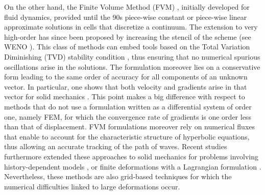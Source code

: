On the other hand, the Finite Volume Method (FVM) \cite{Leveque}, initially developed for fluid dynamics, provided until the 90s piece-wise constant or piece-wise linear approximate solutions in cells that discretize a continuum.
The extension to very high-order has since been proposed by increasing the stencil of the scheme (see WENO \cite{WENO}).
This class of methods can embed tools based on the Total Variation Diminishing (TVD) stability condition \cite{Harten}, thus ensuring that no numerical spurious oscillations arise in the solutions. 
The formulation moreover lies on a conservative form leading to the same order of accuracy for all components of an unknown vector.
In particular, one shows that both velocity and gradients arise in that vector for solid mechanics \cite{Lee_FVM}.
This point makes a big difference with respect to methods that do not use a formulation written as a differential system of order one, namely FEM, for which the convergence rate of gradients is one order less than that of displacement.
FVM formulations moreover rely on numerical fluxes that enable to account for the characteristic structure of hyperbolic equations, thus allowing an accurate tracking of the path of waves.
Recent studies furthermore extended these approaches to solid mechanics for problems involving history-dependent models \cite{Gavrilyuk,Thomas_EP}, or finite deformations with a Lagrangian formulation \cite{Lee_FVM,Haider_FVM}.
Nevertheless, these methods are also grid-based techniques for which the numerical difficulties linked to large deformations occur.

